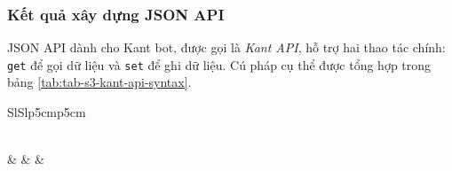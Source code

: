 \subsubsection{Kết quả xây dựng JSON API}
JSON API dành cho Kant bot, được gọi là \textit{Kant API}, hỗ trợ hai thao tác chính: \texttt{get} để gọi dữ liệu và \texttt{set} để ghi dữ liệu. Cú pháp cụ thể được tổng hợp trong bảng \ref{tab:tab-s3-kant-api-syntax}.
\begin{longtable}{SlSlp{5cm}p{5cm}}
		\caption{Cú pháp sử dụng Kant API}\label{tab:tab-s3-kant-api-syntax}\\
		 &  &  &  \\\hline\endfirsthead


\end{longtable}

